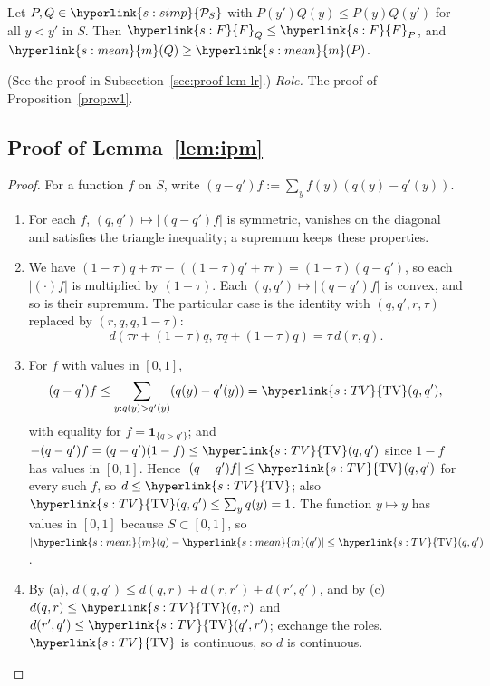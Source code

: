 \documentclass[11pt]{article}
\newcommand{\ind}{\mathbf{1}}
\newcommand{\sy}[2]{{\hyperlink{#1}{#2}}}
\newcommand{\Simp}{\sy{s:simp}{\mathcal{P}_{S}}}
\newcommand{\mean}{\sy{s:mean}{m}}
\newcommand{\Fd}{\sy{s:F}{F}}
\newcommand{\TV}{\sy{s:TV}{\mathrm{TV}}}
\begin{document}
\begin{lemma}\label{lem:lr}
Let $P,Q\in\Simp$ with $P(y')Q(y)\le P(y)Q(y')$ for all $y<y'$ in $S$. Then $\Fd_Q\le \Fd_P$, and
$\mean(Q)\ge \mean(P)$.
\end{lemma}

(See the proof in Subsection~\ref{sec:proof-lem-lr}.) \emph{Role.} The proof of
Proposition~\ref{prop:w1}.

\subsection{Proof of Lemma~\ref{lem:ipm}}\label{sec:proof-lem-ipm}

\begin{proof}
For a function $f$ on $S$, write $(q-q')f:=\sum_yf(y)(q(y)-q'(y))$.
\begin{enumerate}
\item[(a)] For each $f$, $(q,q')\mapsto|(q-q')f|$ is symmetric, vanishes on the diagonal and
  satisfies the triangle inequality; a supremum keeps these properties.
\item[(b)] We have $(1-\tau)q+\tau r-((1-\tau)q'+\tau r)=(1-\tau)(q-q')$, so each $|(\cdot)f|$ is
  multiplied by $(1-\tau)$. Each $(q,q')\mapsto|(q-q')f|$ is convex, and so is their supremum. The
  particular case is the identity with $(q,q',r,\tau)$ replaced by $(r,q,q,1-\tau)$:
  \begin{equation*}
  d(\tau r+(1-\tau)q,\,\tau q+(1-\tau)q)=\tau\,d(r,q).
  \end{equation*}
\item[(c)] For $f$ with values in $[0,1]$,
  \begin{equation*}
  (q-q')f\le\sum_{y:q(y)>q'(y)}(q(y)-q'(y))=\TV(q,q'),
  \end{equation*}
  with equality for $f=\ind_{\{q>q'\}}$; and $-(q-q')f=(q-q')(1-f)\le\TV(q,q')$ since $1-f$ has
  values in $[0,1]$. Hence $|(q-q')f|\le\TV(q,q')$ for every such $f$, so $d\le\TV$; also
  $\TV(q,q')\le\sum_yq(y)=1$. The function $y\mapsto y$ has values in $[0,1]$ because
  $S\subset[0,1]$, so $|\mean(q)-\mean(q')|\le\TV(q,q')$.
\item[(d)] By (a), $d(q,q')\le d(q,r)+d(r,r')+d(r',q')$, and by (c) $d(q,r)\le\TV(q,r)$ and
  $d(r',q')\le\TV(q',r')$; exchange the roles. $\TV$ is continuous, so $d$ is continuous.\qedhere
\end{enumerate}
\end{proof}
\end{document}
